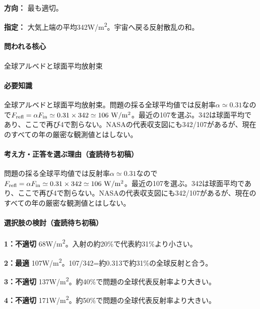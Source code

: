 \noindent\textbf{方向：} 最も適切。\par

\noindent\textbf{指定：} 大気上端の平均342W/m\textsuperscript{2}。宇宙へ戻る反射散乱の和。\par

\paragraph{問われる核心} 全球アルベドと球面平均放射束

\paragraph{必要知識} 全球アルベドと球面平均放射束。問題の採る全球平均値では反射率\(\alpha\simeq0.31\)なので\(F_{\rm refl}=\alpha F_{\rm in}\simeq0.31\times342\simeq106\ {\rm W/m^2}\)。最近の107を選ぶ。342は球面平均であり、ここで再び4で割らない。NASAの代表収支図にも342/107があるが、現在のすべての年の厳密な観測値とはしない。

\paragraph{考え方・正答を選ぶ理由（査読待ち初稿）} 問題の採る全球平均値では反射率\(\alpha\simeq0.31\)なので\(F_{\rm refl}=\alpha F_{\rm in}\simeq0.31\times342\simeq106\ {\rm W/m^2}\)。最近の107を選ぶ。342は球面平均であり、ここで再び4で割らない。NASAの代表収支図にも342/107があるが、現在のすべての年の厳密な観測値とはしない。

\paragraph{選択肢の検討（査読待ち初稿）}\mbox{}\par

\noindent\textbf{1：不適切} 68W/m\textsuperscript{2}。入射の約20\%で代表約31\%より小さい。\par

\noindent\textbf{2：最適} 107W/m\textsuperscript{2}。107/342=約0.313で約31\%の全球反射と合う。\par

\noindent\textbf{3：不適切} 137W/m\textsuperscript{2}。約40\%で問題の全球代表反射率より大きい。\par

\noindent\textbf{4：不適切} 171W/m\textsuperscript{2}。約50\%で問題の全球代表反射率より大きい。\par

